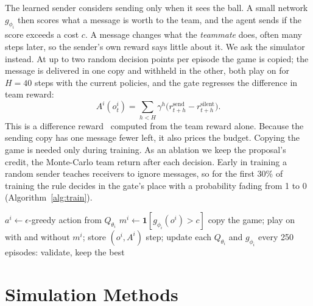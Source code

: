 \documentclass[twocolumn]{article}
\newcommand{\ind}{\mathbf{1}}
\begin{document}
The learned sender considers sending only when it sees the ball. A small network $g_{\phi_i}$ then
scores what a message is worth to the team, and the agent sends if the score exceeds a cost $c$. A
message changes what the \emph{teammate} does, often many steps later, so the sender's own reward says
little about it. We ask the simulator instead. At up to two random decision points per episode the
game is copied; the message is delivered in one copy and withheld in the other, both play on for
$H=40$ steps with the current policies, and the gate regresses the difference in team reward:
\begin{equation}
A^i(o^i_t)=\sum_{h<H}\gamma^h\big(r^{\text{send}}_{t+h}-r^{\text{silent}}_{t+h}\big).
\label{eq:rollout}
\end{equation}
This is a difference reward~\citep{wolpert2002} computed from the team reward alone. Because the sending
copy has one message fewer left, it also prices the budget. Copying the game is needed only during
training. As an ablation we keep the proposal's credit, the Monte-Carlo team return after each
decision. Early in training a random sender teaches receivers to ignore messages, so for the first
30\% of training the rule decides in the gate's place with a probability fading from 1 to 0
(Algorithm~\ref{alg:train}).

\begin{algorithm}[!t]
\caption{Training a team with a learned sender}\label{alg:train}
\small
\begin{algorithmic}[1]
      \State $a^i\gets\epsilon$-greedy action from $Q_{\theta_i}$
        \State $m^i\gets\ind[g_{\phi_i}(o^i)>c]$ 
          \State copy the game; play on with
          \Statex \hspace{2.6em}and without $m^i$; store $(o^i,A^i)$
        \EndIf
      \EndIf
    \EndFor
    \State step; update each $Q_{\theta_i}$ and $g_{\phi_i}$
  \EndWhile
  \State every 250 episodes: validate, keep the best
\EndFor
\end{algorithmic}
\end{algorithm}

\section{Simulation Methods}
\end{document}
